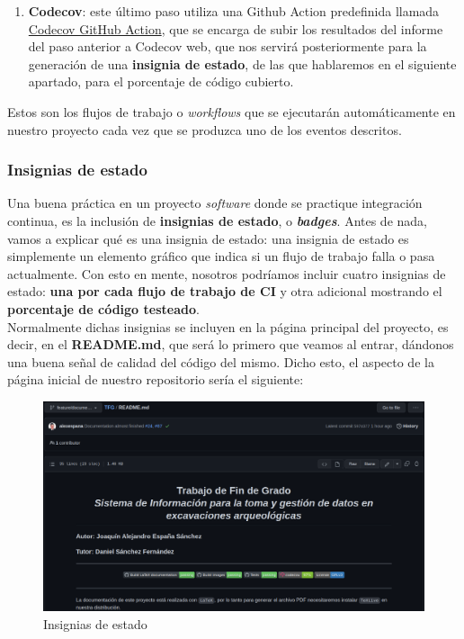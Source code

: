 \begin{enumerate}
\begin{enumerate}
\begin{enumerate}
                        \item \textbf{Codecov}: este último paso utiliza una Github Action
                        predefinida llamada
                        \href{https://github.com/marketplace/actions/codecov}{Codecov GitHub
                        Action}, que se encarga de subir los resultados del informe del paso
                        anterior a Codecov web, que nos servirá posteriormente para la
                        generación de una \textbf{insignia de estado}, de las que hablaremos
                        en el siguiente apartado, para el porcentaje de código cubierto.
                    \end{enumerate}
            \end{enumerate}
    \end{enumerate}

\newpage Estos son los flujos de trabajo o \textit{workflows} que se ejecutarán automáticamente en
nuestro proyecto cada vez que se produzca uno de los eventos descritos.

\subsubsection{Insignias de estado}
Una buena práctica en un proyecto \textit{software} donde se practique integración continua,
es la inclusión de \textbf{insignias de estado}, o \textbf{\textit{badges}}. Antes de nada,
vamos a explicar qué es una insignia de estado: una insignia de estado es simplemente un
elemento gráfico que indica si un flujo de trabajo falla o pasa actualmente. Con esto en
mente, nosotros podríamos incluir cuatro insignias de estado: \textbf{una por cada flujo de
trabajo de CI} y otra adicional mostrando el \textbf{porcentaje de código testeado}.\\

Normalmente dichas insignias se incluyen en la página principal del proyecto, es decir, en
el \textbf{README.md}, que será lo primero que veamos al entrar, dándonos una buena señal
de calidad del código del mismo. Dicho esto, el aspecto de la página inicial de nuestro
repositorio sería el siguiente:

    \begin{figure}[H]
        \centering
        \includegraphics[scale=0.27]{imagenes/badge-status.png}
        \caption{Insignias de estado}
        \label{fig:badge-status}
    \end{figure}

